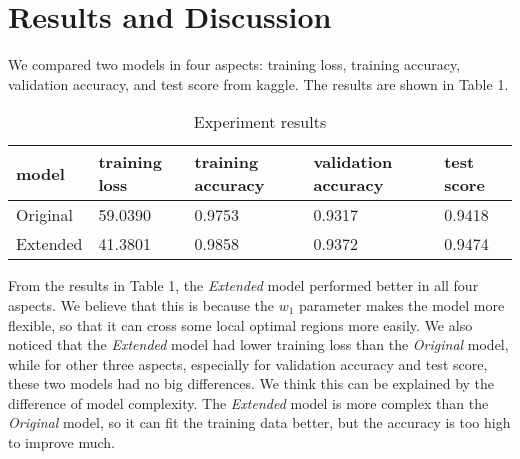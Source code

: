 \section{Results and Discussion}
We compared two models in four aspects: training loss, training accuracy, validation accuracy, and test score from kaggle. The results are shown in Table 1. \\
\begin{table}[htbp]
\label{result}
\centering
\begin{tabular}{|l|l|l|l|l|}
\hline
model    & training loss & training accuracy & validation accuracy & test score \\
\hline
Original & 59.0390       & 0.9753            & 0.9317              & 0.9418 \\
\hline
Extended & 41.3801       & 0.9858            & 0.9372              & 0.9474 \\
\hline
\end{tabular}
\caption{Experiment results}
\end{table}
From the results in Table 1, the \textit{Extended} model performed better in all four aspects. We believe that this is because the $w_1$ parameter makes the model more flexible, so that it can cross some local optimal regions more easily. We also noticed that the \textit{Extended} model had lower training loss than the \textit{Original} model, while for other three aspects, especially for validation accuracy and test score, these two models had no big differences. We think this can be explained by the difference of model complexity. The \textit{Extended} model is more complex than the \textit{Original} model, so it can fit the training data better, but the accuracy is too high to improve much.